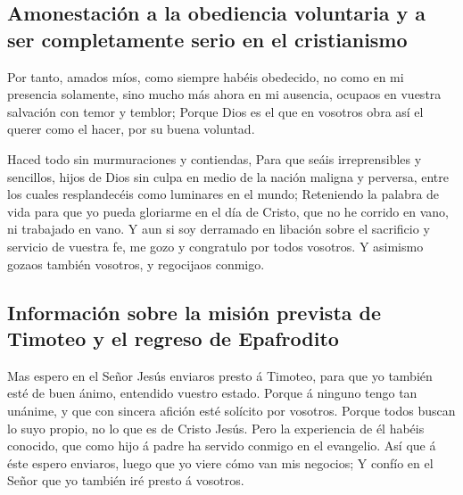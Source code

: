 \hypertarget{amonestaciuxf3n-a-la-obediencia-voluntaria-y-a-ser-completamente-serio-en-el-cristianismo}{%
\subsection{Amonestación a la obediencia voluntaria y a ser
completamente serio en el
cristianismo}\label{amonestaciuxf3n-a-la-obediencia-voluntaria-y-a-ser-completamente-serio-en-el-cristianismo}}

 Por tanto, amados míos, como siempre habéis obedecido, no
como en mi presencia solamente, sino mucho más ahora en mi ausencia,
ocupaos en vuestra salvación con temor y temblor;  Porque
Dios es el que en vosotros obra así el querer como el hacer, por su
buena voluntad.

 Haced todo sin murmuraciones y contiendas, 
Para que seáis irreprensibles y sencillos, hijos de Dios sin culpa en
medio de la nación maligna y perversa, entre los cuales resplandecéis
como luminares en el mundo;  Reteniendo la palabra de vida
para que yo pueda gloriarme en el día de Cristo, que no he corrido en
vano, ni trabajado en vano.  Y aun si soy derramado en
libación sobre el sacrificio y servicio de vuestra fe, me gozo y
congratulo por todos vosotros.  Y asimismo gozaos también
vosotros, y regocijaos conmigo.

\hypertarget{informaciuxf3n-sobre-la-misiuxf3n-prevista-de-timoteo-y-el-regreso-de-epafrodito}{%
\subsection{Información sobre la misión prevista de Timoteo y el regreso
de
Epafrodito}\label{informaciuxf3n-sobre-la-misiuxf3n-prevista-de-timoteo-y-el-regreso-de-epafrodito}}

 Mas espero en el Señor Jesús enviaros presto á Timoteo,
para que yo también esté de buen ánimo, entendido vuestro estado.
 Porque á ninguno tengo tan unánime, y que con sincera
afición esté solícito por vosotros.  Porque todos buscan lo
suyo propio, no lo que es de Cristo Jesús.  Pero la
experiencia de él habéis conocido, que como hijo á padre ha servido
conmigo en el evangelio.  Así que á éste espero enviaros,
luego que yo viere cómo van mis negocios;  Y confío en el
Señor que yo también iré presto á vosotros.


